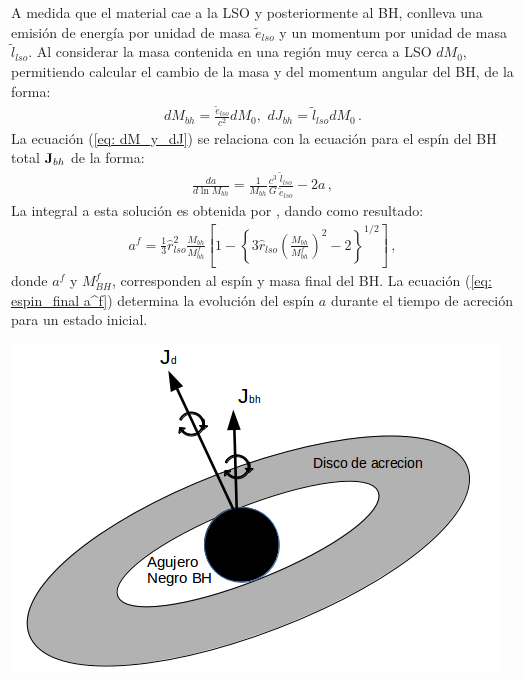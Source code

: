 A medida que el material cae a la LSO y posteriormente al BH, conlleva  una emisión de energía por unidad de masa $\widetilde{e}_{lso}$ y un momentum por unidad de masa $\widetilde{l}_{lso}$. Al considerar la masa contenida en una región muy cerca a LSO $dM_{0}$, permitiendo calcular el cambio de la masa y del momentum angular del BH, de la forma\cite{fanidakis2011}:
%
\begin{align}
    dM_{bh}=\frac{\widetilde{e}_{lso}}{c^{2}}dM_{0}, \, \, dJ_{bh}=\widetilde{l}_{lso}dM_{0}\,.
    \label{eq: dM_y_dJ}
\end{align}
%
La ecuación (\ref{eq: dM_y_dJ}) se relaciona con la ecuación para el espín del BH total ${\bf{J}}_{bh}$ de la forma:
%
\begin{align}
    \frac{da}{d\ln{M_{bh}}}=\frac{1}{M_{bh}}\frac{c^{3}}{G}\frac{\widetilde{l}_{lso}}{\widetilde{e}_{lso}}-2a\,,
\end{align}
%
La integral a esta solución es obtenida por \cite{bardeen1970}, dando como resultado: 
\begin{align}
    a^{f}=\frac{1}{3}\hat{r}_{lso}^{2}\frac{M_{bh}}{M_{bh}^{f}}\left[1- \left\{3\hat{r}_{lso}\left(\frac{M_{bh}}{M^{f}_{bh}} \right)^{2}-2 \right\}^{1/2} \right]\,,
    \label{eq: espin_final a^f}
\end{align}
donde $a^{f}$ y $M_{BH}^{f}$, corresponden al espín y masa final del BH. La ecuación (\ref{eq: espin_final a^f}) determina la evolución del espín $a$ durante el tiempo de acreción para un estado inicial. 

\begin{center}
\includegraphics[scale=.35]{./figures/4_Modelo_Spin/Modelo_disco_bh.png}
\label{fig: desaliniamineto_bh_disco}
\end{center}

